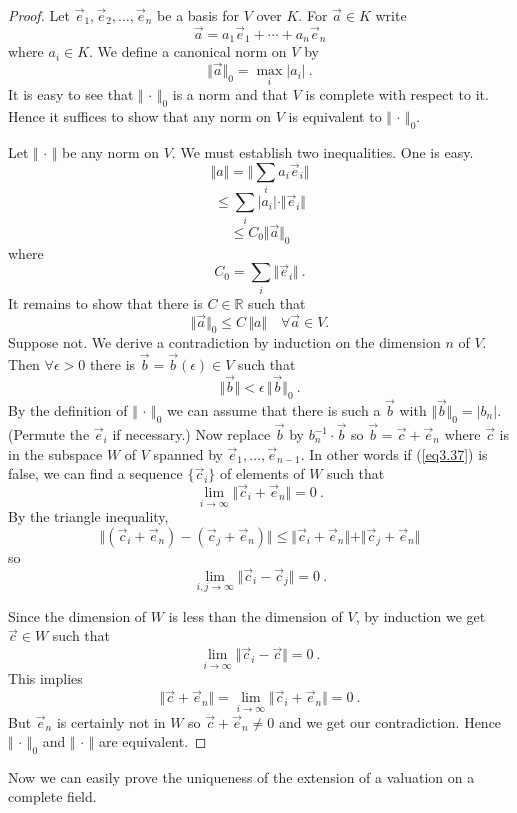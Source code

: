 \begin{proof}
Let $\vec{e}_{1},\vec{e}_{2},\ldots,\vec{e}_{n}$ be a basis for $V$ over $K$. For $\vec{a}\in K$ write
$$
\vec{a}=a_{1}\vec{e}_{1}+\cdots+a_{n}\vec{e}_{n}
$$
where $a_{i}\in K$. We define a canonical norm on $V$ by
$$
\Vert\vec{a}\Vert_{0}=\max_{i}|a_{i}|\ .
$$
It is easy to see that $\Vert\, \cdot\, \Vert_{0}$ is a norm and that $V$ is complete with respect to it. Hence it suffices to show that any norm on $V$ is equivalent to $\Vert\, \cdot\, \Vert_{0}$.

Let $\Vert\, \cdot\, \Vert$ be any norm on $V$. We must establish two inequalities. One is easy.
$$
\Vert a\Vert=\Vert\sum_{i}a_{i}\vec{e}_{i}\Vert
$$
$$
\leq\sum_{i}|a_{i}|\cdot\Vert\vec{e}_{i}\Vert
$$
$$
\leq C_{0}\Vert\vec{a}\Vert_{0}
$$
where
$$
 C_{0}=\sum_{i}\Vert\vec{e}_{i}\Vert\ .
$$
It remains to show that there is $C\in \mathbb{R}$ such that
\begin{equation}
\label{eq3.37}
\Vert\vec{a}\Vert_{0}\leq C \, \Vert a\Vert \quad \forall\vec{a}\in V .
\end{equation}
Suppose not. We derive a contradiction by induction on the dimension $n$ of $V$. Then $\forall \epsilon>0$ there is $\vec{b}=\vec{b}(\epsilon) \in V$ such that
$$
\Vert\vec{b}\Vert < \epsilon \, \Vert\vec{b}\Vert_{0}\ .
$$
By the definition of $\Vert\, \cdot\, \Vert_{0}$ we can assume that there is such a $\vec{b}$ with $\Vert\vec{b}\Vert_{0}=|b_{n}|$. (Permute the $\vec{e}_{i}$ if necessary.) Now replace $\vec{b}$ by $b_{n}^{-1}\cdot\vec{b}$ so $\vec{b}=\vec{c}+\vec{e}_{n}$ where $\vec{c}$ is in the subspace $W$ of $V$ spanned by $\vec{e}_{1},\ldots,\vec{e}_{n-1}$. In other words if (\ref{eq3.37}) is false, we can find a sequence $\{\vec{c}_{i}\}$ of elements of $W$ such that
$$
\lim_{i\rightarrow\infty}\Vert\vec{c}_{i}+\vec{e}_{n}\Vert=0\ .
$$
By the triangle inequality,
$$
\Vert(\vec{c}_{i}+\vec{e}_{n})-(\vec{c}_{j}+\vec{e}_{n})\Vert\leq\Vert\vec{c}_{i}+\vec{e}_{n}\Vert+\Vert\vec{c}_{j}+\vec{e}_{n}\Vert
$$
so
$$
\lim_{i, j\rightarrow\infty}\Vert\vec{c}_{i}-\vec{c}_{j}\Vert=0\ .
$$

Since the dimension of $W$ is less than the dimension of $V$, by induction we get $\vec{c}\in W$ such that
$$
\lim_{i\rightarrow\infty}\Vert\vec{c}_{i}-\vec{c}\Vert=0\ .
$$
This implies
$$
\Vert\vec{c}+\vec{e}_{n}\Vert=\lim_{i\rightarrow\infty}\Vert\vec{c}_{i}+\vec{e}_{n}\Vert=0\ .
$$
But $\vec{e}_{n}$ is certainly not in $W$ so $\vec{c}+\vec{e}_{n}\neq 0$ and we get our contradiction. Hence $\Vert\, \cdot\, \Vert_{0}$ and $\Vert\, \cdot\, \Vert$ are equivalent.
\end{proof}
Now we can easily prove the uniqueness of the extension of a valuation on a complete field.

